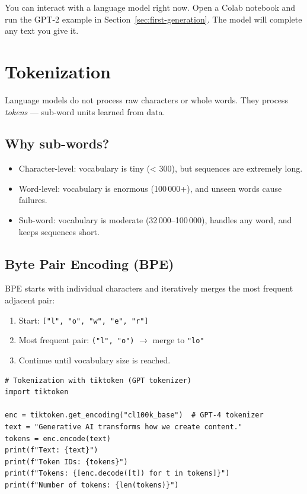 \begin{aitip}
You can interact with a language model right now. Open a Colab notebook and run the GPT-2 example in Section~\ref{sec:first-generation}. The model will complete any text you give it.
\end{aitip}

\section{Tokenization}

Language models do not process raw characters or whole words. They process \emph{tokens} --- sub-word units learned from data.

\subsection{Why sub-words?}

\begin{itemize}
  \item Character-level: vocabulary is tiny (< 300), but sequences are extremely long.
  \item Word-level: vocabulary is enormous (100\,000+), and unseen words cause failures.
  \item Sub-word: vocabulary is moderate (32\,000--100\,000), handles any word, and keeps sequences short.
\end{itemize}

\subsection{Byte Pair Encoding (BPE)}

BPE starts with individual characters and iteratively merges the most frequent adjacent pair:

\begin{enumerate}
  \item Start: \texttt{["l", "o", "w", "e", "r"]}
  \item Most frequent pair: \texttt{("l", "o")} $\rightarrow$ merge to \texttt{"lo"}
  \item Continue until vocabulary size is reached.
\end{enumerate}

\begin{verbatim}
# Tokenization with tiktoken (GPT tokenizer)
import tiktoken

enc = tiktoken.get_encoding("cl100k_base")  # GPT-4 tokenizer
text = "Generative AI transforms how we create content."
tokens = enc.encode(text)
print(f"Text: {text}")
print(f"Token IDs: {tokens}")
print(f"Tokens: {[enc.decode([t]) for t in tokens]}")
print(f"Number of tokens: {len(tokens)}")
\end{verbatim}

